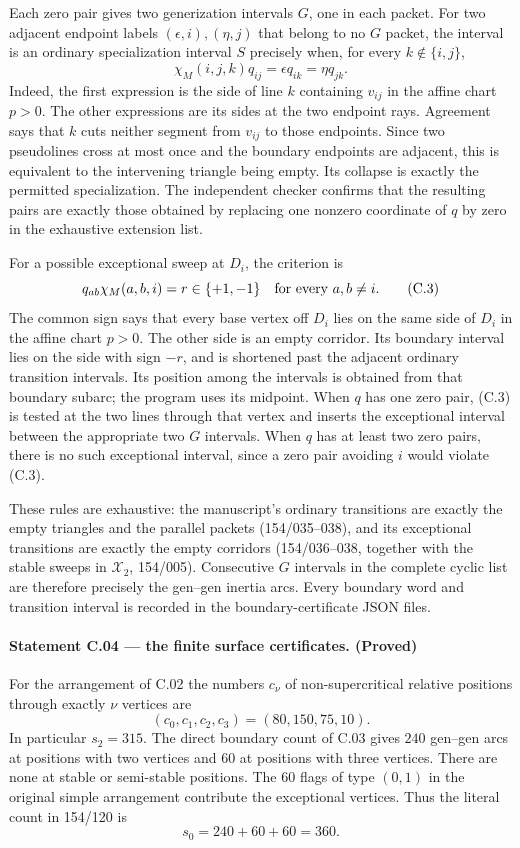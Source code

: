 \documentclass[11pt,a4paper]{article}
\begin{document}
Each zero pair gives two generization intervals $G$, one in each
packet. For two adjacent endpoint labels $(\epsilon,i),(\eta,j)$
that belong to no $G$ packet, the interval is an ordinary
specialization interval $S$ precisely when, for every
$k\notin\{i,j\}$,
\[
 \chi_M(i,j,k)q_{ij}
     =\epsilon q_{ik}=\eta q_{jk}.             \tag{C.2}
\]
Indeed, the first expression is the side of line $k$ containing
$v_{ij}$ in the affine chart $p>0$. The other expressions are its
sides at the two endpoint rays. Agreement says that $k$ cuts neither
segment from $v_{ij}$ to those endpoints. Since two pseudolines
cross at most once and the boundary endpoints are adjacent, this
is equivalent to the intervening triangle being empty. Its
collapse is exactly the permitted specialization. The independent
checker confirms that the resulting pairs are exactly those
obtained by replacing one nonzero coordinate of $q$ by zero in
the exhaustive extension list.

For a possible exceptional sweep at $D_i$, the criterion is
\[
 q_{ab}\chi_M(a,b,i)=r\in\{+1,-1\}
 \quad\hbox{for every }a,b\ne i.              \tag{C.3}
\]
The common sign says that every base vertex off $D_i$ lies on the
same side of $D_i$ in the affine chart $p>0$. The other side is an
empty corridor. Its boundary interval lies on the side with sign
$-r$, and is shortened past the adjacent ordinary transition
intervals. Its position among the intervals is obtained from that
boundary subarc; the program uses its midpoint. When $q$ has one
zero pair, (C.3) is tested at the two lines through that vertex and
inserts the exceptional interval between the appropriate two
$G$ intervals. When $q$ has at least two zero pairs, there is no
such exceptional interval, since a zero pair avoiding $i$ would
violate (C.3).

These rules are exhaustive: the manuscript's ordinary transitions
are exactly the empty triangles and the parallel packets
(154/035--038), and its exceptional transitions are exactly the
empty corridors (154/036--038, together with the stable sweeps in
$\mathcal X_2$, 154/005). Consecutive $G$ intervals in the complete
cyclic list are therefore precisely the gen--gen inertia arcs.
Every boundary word and transition interval is recorded in the
boundary-certificate JSON files.

\paragraph{Statement C.04 --- the finite surface certificates. (Proved)}\label{C.04}
For the arrangement of C.02 the numbers $c_\nu$ of non-supercritical
relative positions through exactly $\nu$ vertices are
\[
 (c_0,c_1,c_2,c_3)=(80,150,75,10).
\]
In particular $s_2=315$. The direct boundary count of C.03 gives
$240$ gen--gen arcs at positions with two vertices and $60$ at
positions with three vertices. There are none at stable or
semi-stable positions. The $60$ flags of type $(0,1)$ in the
original simple arrangement contribute the exceptional vertices.
Thus the literal count in 154/120 is
\[
             s_0=240+60+60=360.               \tag{C.4}
\]
\end{document}
